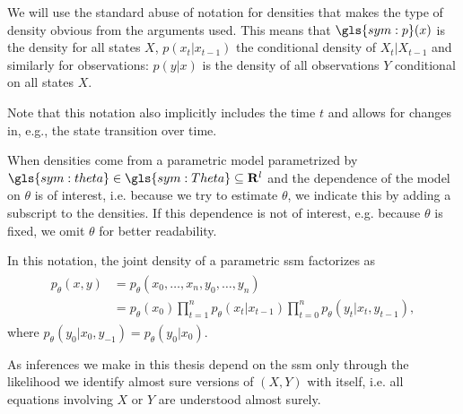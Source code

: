 \begin{notation}
    \label{not:densities}
    We will use the standard abuse of notation for densities that makes the type of density \glqq{}obvious\grqq{} from the arguments used.
    This means that $\gls{sym:p}(x)$ is the density for all states $X$, $p(x_t|x_{t - 1})$ the conditional density of $X_t|X_{t - 1}$ and similarly for observations: $p(y|x)$ is the density of all observations $Y$ conditional on all states $X$.

    Note that this notation also implicitly includes the time $t$ and allows for changes in, e.g., the state transition over time.

    When densities come from a parametric model parametrized by $\gls{sym:theta}\in \gls{sym:Theta} \subseteq \mathbf{R}^{l}$ and the dependence of the model on $\theta$ is of interest, i.e. because we try to estimate $\theta$, we indicate this by adding a subscript to the densities.
    If this dependence is not of interest, e.g. because $\theta$ is fixed, we omit $\theta$ for better readability.

    In this notation, the joint density of a parametric \gls{ssm} factorizes as
    \begin{align}
        \label{eq:joint_density}
        \begin{split}
        p_\theta(x,y) & = p_\theta(x_0, \dots, x_{n}, y_0, \dots, y_{n})                                                              \\
                      & = p_\theta (x_0)\prod_{t = 1}^{n} p_\theta(x_{t}|x_{t - 1}) \prod_{t = 0}^{n} p_\theta(y_t | x_t, y_{t - 1}),
        \end{split}
    \end{align}
    where $p_\theta(y_0|x_0, y_{-1}) = p_\theta(y_0| x_0)$.

    As inferences we make in this thesis depend on the \gls{ssm} only through the likelihood we identify almost sure versions of $(X, Y)$ with itself, i.e. all equations involving $X$ or $Y$ are understood almost surely.
\end{notation}

